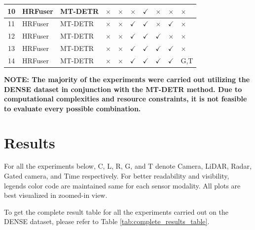 \documentclass[report.tex]{subfiles}
\begin{document}
\begin{itemize}
\begin{table}[h!]
\begin{tabular}{|c|l|l|c|c|c|c|c|c|l|}
                    \hline
                    10 & HRFuser & MT-DETR & $\times$ & $\times$ & $\times$ & $\checkmark$ & $\times$ & $\times$ & $\times$ \\
                    \hline
                    11 & HRFuser & MT-DETR & $\times$ & $\times$ & $\checkmark$ & $\checkmark$ & $\times$ & $\checkmark$ & $\times$ \\
                    \hline
                    12 & HRFuser & MT-DETR & $\times$ & $\times$ & $\checkmark$ & $\checkmark$ & $\checkmark$ & $\times$ & $\times$ \\
                    \hline
                    13 & HRFuser & MT-DETR & $\times$ & $\times$ & $\checkmark$ & $\checkmark$ & $\checkmark$ & $\checkmark$ & $\times$ \\
                    \hline
                    14 & HRFuser & MT-DETR & $\times$ & $\times$ & $\checkmark$ & $\checkmark$ & $\checkmark$ & $\checkmark$ & G,T \\
                    \hline
                    \end{tabular}
                    \label{tab:experiment_combinations}
                \end{table}
                
            \textbf{NOTE: The majority of the experiments were carried out utilizing the DENSE dataset in conjunction with the MT-DETR method. Due to computational complexities and resource constraints, it is not feasible to evaluate every possible combination.}
                
        \end{itemize}
    

    \section{Results}

    For all the experiments below, C, L, R, G, and T denote Camera, LiDAR, Radar, Gated camera, and Time respectively. For better readability and visibility, legends color code are maintained same for each sensor modality. All plots are best visualized in zoomed-in view.

    To get the complete result table for all the experiments carried out on the DENSE dataset, please refer to Table \ref{tab:complete_results_table}.
\end{document}
